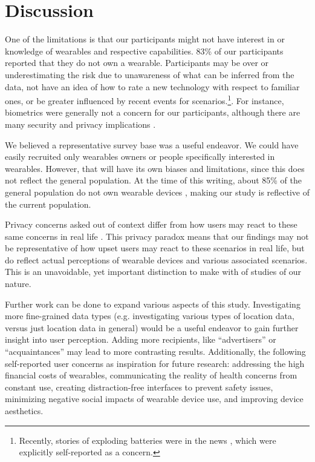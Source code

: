 
\section{Discussion}

One of the limitations is that our participants might not have interest in or knowledge of wearables and respective capabilities. 83\% of our participants reported that they do not own a wearable. Participants may be over or underestimating the risk due to unawareness of what can be inferred from the data, not have an idea of how to rate a new technology with respect to familiar ones, or be greater influenced by recent events for scenarios.\footnote{Recently, stories  of  exploding batteries were in the news \cite{1_levin_2014}, which were explicitly self-reported as a concern.}.  For instance, biometrics were generally not a concern for our participants, although there are many security and privacy implications \cite{prabhakar2003biometric}.

We believed a representative survey base was a useful endeavor. We could have easily recruited only wearables owners or people specifically interested in wearables. However, that will have its own biases and limitations, since this does not reflect the general population. At the time of this writing, about 85\% of the general population do not own wearable devices \cite{Nilsen,WearableStatNews}, making our study is reflective of the current population. 

Privacy concerns asked out of context differ from how users may react to these same concerns in real life \cite{norberg2007privacy, jensen2005privacy}. This privacy paradox means that our findings may not be representative of how upset users may react to these scenarios in real life, but do reflect actual perceptions of wearable devices and various associated scenarios. This is an unavoidable, yet important distinction to make with of studies of our nature.

Further work can be done to expand various aspects of this study. Investigating more fine-grained data types (e.g. investigating various types of location data, versus just location data in general) would be a useful endeavor to gain further insight into user perception. Adding more recipients, like ``advertisers'' or ``acquaintances'' may lead to more contrasting results. Additionally, the following self-reported user concerns as inspiration for future research: addressing the high financial costs of wearables, communicating the reality of health concerns from constant use, creating distraction-free interfaces to prevent safety issues, minimizing negative social impacts of wearable device use, and improving device aesthetics.  

